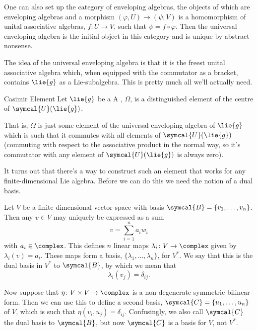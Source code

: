 \documentclass[fleqn]{NotesClass}
\newcommand{\universalenveloping}{\symcal{U}}
\newcommand{\basis}{\symcal{B}}
\begin{document}
    One can also set up the category of enveloping algebras, the objects of which are enveloping algebras and a morphism \((\varphi, U) \to (\psi, V)\) is a homomorphism of unital associative algebras, \(f \colon U \to V\), such that \(\psi = f \circ \varphi\).
    Then the universal enveloping algebra is the initial object in this category and is unique by abstract nonsense.
	
    The idea of the universal enveloping algebra is that it is the freest unital associative algebra which, when equipped with the commutator as a bracket, contains \(\lie{g}\) as a Lie-subalgebra.
    This is pretty much all we'll actually need.
    
    \begin{dfn}{Casimir Element}{}
        Let \(\lie{g}\) be a 
        A , \(\Omega\), is a distinguished element of the centre of \(\universalenveloping(\lie{g})\).
    \end{dfn}
    
    That is, \(\Omega\) is just some element of the universal enveloping algebra of \(\lie{g}\) which is such that it commutes with all elements of \(\universalenveloping(\lie{g})\) (commuting with respect to the associative product in the normal way, so it's commutator with any element of \(\universalenveloping(\lie{g})\) is always zero).
    
    It turns out that there's a way to construct such an element that works for any finite-dimensional Lie algebra.
    Before we can do this we need the notion of a dual basis.
    
    Let \(V\) be a finite-dimensional vector space with basis \(\basis = \{v_1, \dotsc, v_n\}\).
    Then any \(v \in V\) may uniquely be expressed as a sum
    \begin{equation}
        v = \sum_{i=1}^n a_i w_i
    \end{equation}
    with \(a_i \in \complex\).
    This defines \(n\) linear maps \(\lambda_i \colon V \to \complex\) given by \(\lambda_i(v) = a_i\).
    These maps form a basis, \(\{\lambda_1, \dotsc, \lambda_n\}\), for \(V^*\).
    We say that this is the dual basis in \(V^*\) to \(\basis\), by which we mean that
    \begin{equation}
        \lambda_i(v_j) = \delta_{ij}.
    \end{equation}
    
    Now suppose that \(\eta \colon V \times V \to \complex\) is a non-degenerate symmetric bilinear form.
    Then we can use this to define a second basis, \(\symcal{C} = \{u_1, \dotsc, u_n\}\) of \(V\), which is such that \(\eta(v_i, u_j) = \delta_{ij}\).
    Confusingly, we also call \(\symcal{C}\) the dual basis to \(\basis\), but now \(\symcal{C}\) is a basis for \(V\), not \(V^*\).
    
\end{document}
